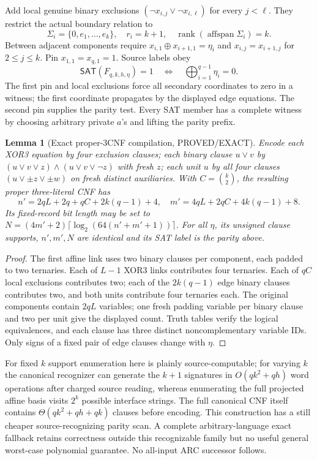 \documentclass[11pt]{article}
\newtheorem{lemma}[theorem]{Lemma}
\newcommand{\SAT}{\mathsf{SAT}}
\begin{document}
Add local genuine binary exclusions
\((\neg x_{i,j}\vee\neg x_{i,\ell})\) for every \(j<\ell\).
They restrict the actual boundary relation to
\[
\Sigma_i=\{0,e_1,\ldots,e_k\},\quad
r_i=k+1,\quad
\operatorname{rank}(\operatorname{affspan}\Sigma_i)=k.
\]
Between adjacent components require
\(x_{i,1}\oplus x_{i+1,1}=\eta_i\) and
\(x_{i,j}=x_{i+1,j}\) for \(2\le j\le k\).
Pin \(x_{1,1}=x_{q,1}=1\). Source labels obey
\[
\SAT(F_{q,k,h,\eta})=1\quad\Longleftrightarrow\quad
\bigoplus_{i=1}^{q-1}\eta_i=0.
\]
The first pin and local exclusions force all secondary
coordinates to zero in a witness; the first coordinate propagates
by the displayed edge equations. The second pin supplies the parity
test. Every SAT member has a complete witness by choosing arbitrary
private \(a\)'s and lifting the parity prefix.

\begin{lemma}[Exact proper-3CNF compilation, PROVED/EXACT]
Encode each XOR3 equation by four exclusion clauses;
each binary clause \(u\vee v\) by
\((u\vee v\vee z)\wedge(u\vee v\vee\neg z)\)
with fresh \(z\); each unit \(u\) by all four clauses
\((u\vee\pm z\vee\pm w)\) on fresh distinct auxiliaries.
With \(C={k\choose2}\), the resulting proper three-literal CNF has
\[
n'=2qL+2q+qC+2k(q-1)+4,\quad
m'=4qL+2qC+4k(q-1)+8.
\]
Its fixed-record bit length may be set to
\(N=(4m'+2)\lceil\log_2(64(n'+m'+1))\rceil\).
For all \(\eta\), its unsigned clause supports, \(n',m',N\)
are identical and its SAT label is the parity above.
\end{lemma}
\begin{proof}
The first affine link uses two binary clauses per component, each
padded to two ternaries. Each of \(L-1\) XOR3 links contributes
four ternaries. Each of \(qC\) local exclusions contributes two;
each of the \(2k(q-1)\) edge binary clauses contributes two,
and both units contribute four ternaries each.
The original components contain \(2qL\) variables;
one fresh padding variable per binary clause and two per unit give
the displayed count. Truth tables verify the logical equivalences,
and each clause has three distinct noncomplementary variable IDs.
Only signs of a fixed pair of edge clauses change with \(\eta\).
\end{proof}

For fixed \(k\) support enumeration here is plainly source-computable;
for varying \(k\) the canonical recognizer can generate the \(k+1\)
signatures in \(O(qk^2+qh)\) word operations after charged source reading,
whereas enumerating the full projected affine basis visits \(2^k\)
possible interface strings. The full canonical CNF itself contains
\(\Theta(qk^2+q h+qk)\) clauses before encoding.
This construction has a still cheaper source-recognizing parity scan.
A complete arbitrary-language exact fallback retains correctness
outside this recognizable family but no useful general worst-case
polynomial guarantee. No all-input ARC successor follows.
\end{document}

